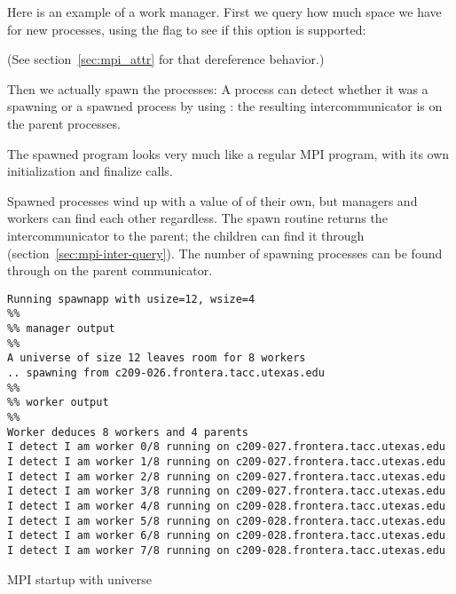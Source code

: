 Here is an example of a work manager.
%
First we query how much space we have for new processes,
using the flag to see if this option is supported:
%

(See section~\ref{sec:mpi_attr} for that dereference behavior.)

Then we actually spawn the processes:
%
%
%
A process can detect whether it was a spawning or a spawned process
by using :
the resulting intercommunicator is 
on the parent processes.

The spawned program looks very much like a regular MPI program, with
its own initialization and finalize calls.

%

Spawned processes wind up with a value of  of their
own, but managers and workers can find each other regardless.
The spawn routine returns the intercommunicator to the parent; the children
can find it through  (section~\ref{sec:mpi-inter-query}).
The number of spawning processes can be found through
 on the parent communicator.

\begin{verbatim}
Running spawnapp with usize=12, wsize=4
%%
%% manager output
%%
A universe of size 12 leaves room for 8 workers
.. spawning from c209-026.frontera.tacc.utexas.edu
%%
%% worker output
%%
Worker deduces 8 workers and 4 parents
I detect I am worker 0/8 running on c209-027.frontera.tacc.utexas.edu
I detect I am worker 1/8 running on c209-027.frontera.tacc.utexas.edu
I detect I am worker 2/8 running on c209-027.frontera.tacc.utexas.edu
I detect I am worker 3/8 running on c209-027.frontera.tacc.utexas.edu
I detect I am worker 4/8 running on c209-028.frontera.tacc.utexas.edu
I detect I am worker 5/8 running on c209-028.frontera.tacc.utexas.edu
I detect I am worker 6/8 running on c209-028.frontera.tacc.utexas.edu
I detect I am worker 7/8 running on c209-028.frontera.tacc.utexas.edu
\end{verbatim}

 {MPI startup with universe}

